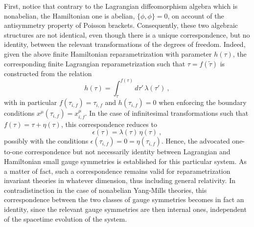 \documentclass[a4paper,11pt]{article}
\begin{document}
First, notice that contrary to the Lagrangian diffeomorphism algebra
which is nonabelian, the Hamiltonian one is abelian, $\{\phi,\phi\}=0$,
on account of the antisymmetry property of Poisson brackets. Consequently,
these two algebraic structures are not identical, even though there is
a unique correspondence, but no identity, between the relevant transformations
of the degrees of freedom. Indeed, given the above finite
Hamiltonian reparametrization with parameter $h(\tau)$, the corresponding
finite Lagrangian reparametrization such that $\tau=f(\tilde{\tau})$
is constructed from the relation\cite{JG1}
\begin{equation}
h(\tau)=\int_\tau^{f(\tau)}d\tau'\,\lambda(\tau')\ ,
\end{equation}
with in particular $f(\tau_{i,f})=\tau_{i,f}$ and $h(\tau_{i,f})=0$ when
enforcing the boundary conditions $x^\mu(\tau_{i,f})=x^\mu_{i,f}$. In the
case of infinitesimal transformations such that $f(\tau)=\tau+\eta(\tau)$, 
this correspondence reduces to
\begin{equation}
\epsilon(\tau)=\lambda(\tau)\,\eta(\tau)\ ,
\end{equation}
possibly with the conditions $\epsilon(\tau_{i,f})=0=\eta(\tau_{i,f})$.
Hence, the advocated one-to-one correspondence but not necessarily
identity between Lagrangian and Hamiltonian small gauge symmetries is
established for this particular system. As a matter of fact, such a
correspondence remains valid for reparametrization invariant theories
in whatever dimension, thus including general relativity. In contradistinction
in the case of nonabelian Yang-Mills theories, this cor\-res\-pon\-den\-ce 
between the two classes of gauge symmetries becomes in fact an identity, since
the relevant gauge symmetries are then internal ones, independent of the
spacetime evolution of the system.
\end{document}
